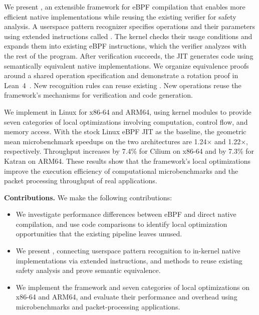 We present \tool, an extensible framework for eBPF compilation that enables more efficient native implementations while reusing the existing verifier for safety analysis. A userspace pattern recognizer specifies operations and their parameters using extended instructions called \kinsns. The kernel checks their usage conditions and expands them into existing eBPF instructions, which the verifier analyzes with the rest of the program. After verification succeeds, the JIT generates code using semantically equivalent native implementations. We organize equivalence proofs around a shared operation specification and demonstrate a rotation proof in Lean~4~\cite{moura2021lean}. New recognition rules can reuse existing \kinsns. New operations reuse the framework's mechanisms for verification and code generation.

We implement \tool in Linux for x86-64 and ARM64, using kernel modules to provide seven categories of local optimizations involving computation, control flow, and memory access. With the stock Linux eBPF JIT as the baseline, the geometric mean microbenchmark speedups on the two architectures are 1.24$\times$ and 1.22$\times$, respectively. Throughput increases by 7.4\% for Cilium on x86-64 and by 7.3\% for Katran on ARM64. These results show that the framework's local optimizations improve the execution efficiency of computational microbenchmarks and the packet processing throughput of real applications.

\noindent\textbf{Contributions.}
We make the following contributions:
\begin{itemize}
    \item We investigate performance differences between eBPF and direct native compilation, and use code comparisons to identify local optimization opportunities that the existing pipeline leaves unused.
    \item We present \tool, connecting userspace pattern recognition to in-kernel native implementations via extended instructions, and methods to reuse existing safety analysis and prove semantic equivalence.
    \item We implement the framework and seven categories of local optimizations on x86-64 and ARM64, and evaluate their performance and overhead using microbenchmarks and packet-processing applications.
\end{itemize}
